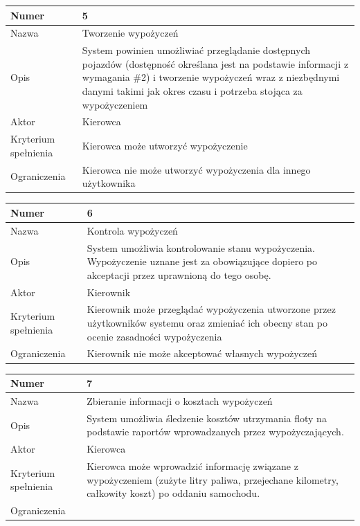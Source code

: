 \documentclass[eng,printmode,openany]{mgr}
\begin{document}
	\begin{table}[H]
		\begin{tabularx}{\textwidth}{|l|X|}
			\hline
			Numer                & 5 \\ \hline
			Nazwa                & Tworzenie wypożyczeń \\ \hline
			Opis                 & System powinien umożliwiać przeglądanie dostępnych pojazdów (dostępność określana jest na podstawie informacji z wymagania \#2) i tworzenie wypożyczeń wraz z niezbędnymi danymi takimi jak okres czasu i potrzeba stojąca za wypożyczeniem\\ \hline
			Aktor                & Kierowca \\ \hline
			Kryterium spełnienia & Kierowca może utworzyć wypożyczenie \\ \hline
			Ograniczenia         & Kierowca nie może utworzyć wypożyczenia dla innego użytkownika \\ \hline
		\end{tabularx}
	\end{table}
	
	\begin{table}[H]
		\begin{tabularx}{\textwidth}{|l|X|}
			\hline
			Numer                & 6 \\ \hline
			Nazwa                & Kontrola wypożyczeń\\ \hline
			Opis                 & System umożliwia kontrolowanie stanu wypożyczenia. Wypożyczenie uznane jest za obowiązujące dopiero po akceptacji przez uprawnioną do tego osobę.\\ \hline
			Aktor                & Kierownik \\ \hline
			Kryterium spełnienia & Kierownik może przeglądać wypożyczenia utworzone przez użytkowników systemu oraz zmieniać ich obecny stan po ocenie zasadności wypożyczenia \\ \hline
			Ograniczenia         & Kierownik nie może akceptować własnych wypożyczeń \\ \hline
		\end{tabularx}
	\end{table}
	
	\begin{table}[H]
		\begin{tabularx}{\textwidth}{|l|X|}
			\hline
			Numer                & 7 \\ \hline
			Nazwa                & Zbieranie informacji o kosztach wypożyczeń\\ \hline
			Opis                 & System umożliwia śledzenie kosztów utrzymania floty na podstawie raportów wprowadzanych przez wypożyczających. \\ \hline
			Aktor                & Kierowca\\ \hline
			Kryterium spełnienia & Kierowca może wprowadzić informację związane z wypożyczeniem (zużyte litry paliwa, przejechane kilometry, całkowity koszt) po oddaniu samochodu.\\ \hline
			Ograniczenia         & \\ \hline
		\end{tabularx}
	\end{table}
	
\end{document}
